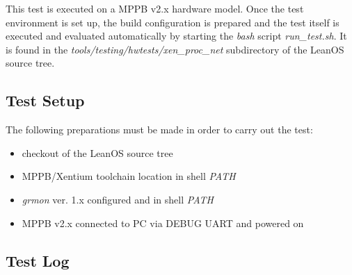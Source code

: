 This test is executed on a \gls{MPPB} v2.x hardware model. Once the test
environment is set up, the build configuration is prepared and the test itself
is executed and evaluated automatically by starting the \emph{bash} script
\emph{run\_test.sh}. It is found in the 
\mbox{\emph{tools/testing/hwtests/xen\_proc\_net}} subdirectory of the LeanOS
source tree.


\subsection*{Test Setup}

The following preparations must be made in order to carry out the test:

\begin{itemize}
	\item checkout of the LeanOS source tree
	\item \gls{MPPB}/\gls{Xentium} toolchain location in shell \emph{PATH}
	\item \emph{grmon} ver. 1.x configured and in shell \emph{PATH}
	\item \gls{MPPB} v2.x connected to PC via DEBUG UART and powered on
\end{itemize}


\subsection*{Test Log}




